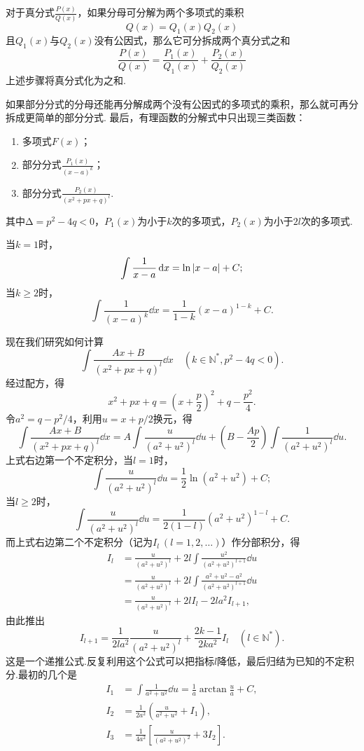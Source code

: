对于真分式\(\frac{P(x)}{Q(x)}\)，如果分母可分解为两个多项式的乘积\[
Q(x)=Q_1(x)Q_2(x)
\]且\(Q_1(x)\)与\(Q_2(x)\)没有公因式，那么它可分拆成两个真分式之和\[
\frac{P(x)}{Q(x)} = \frac{P_1(x)}{Q_1(x)} + \frac{P_2(x)}{Q_2(x)}
\]上述步骤将真分式化为之和.

如果部分分式的分母还能再分解成两个没有公因式的多项式的乘积，那么就可再分拆成更简单的部分分式.
最后，有理函数的分解式中只出现三类函数：
\begin{enumerate}
	\item 多项式\(F(x)\)；
	\item 部分分式\(\frac{P_1(x)}{(x-a)^k}\)；
	\item 部分分式\(\frac{P_2(x)}{(x^2+px+q)^l}\).
\end{enumerate}
其中\(\increment=p^2-4q<0\)，\(P_1(x)\)为小于\(k\)次的多项式，\(P_2(x)\)为小于\(2l\)次的多项式.

当\(k=1\)时，\[
\int \frac{1}{x-a} \dd{x} = \ln\abs{x-a} + C;
\]当\(k\geqslant2\)时，\[
\int \frac{1}{(x-a)^k} \dd{x} = \frac{1}{1-k} (x-a)^{1-k} + C.
\]

现在我们研究如何计算\[
\int \frac{Ax+B}{(x^2+px+q)^l} \dd{x}
\quad(k\in\mathbb{N}^*, p^2-4q<0).
\]经过配方，得\[
x^2+px+q = \left(x+\frac{p}{2}\right)^2 + q-\frac{p^2}{4}.
\]令\(a^2=q-p^2/4\)，利用\(u=x+p/2\)换元，得\[
\int \frac{Ax+B}{(x^2+px+q)^l} \dd{x}
= A \int \frac{u}{(a^2+u^2)^l} \dd{u}
+ \left(B - \frac{Ap}{2}\right) \int \frac{1}{(a^2+u^2)^l} \dd{u}.
\]上式右边第一个不定积分，当\(l=1\)时，\[
\int \frac{u}{(a^2+u^2)^l} \dd{u}
= \frac{1}{2} \ln(a^2+u^2) + C;
\]当\(l\geqslant2\)时，\[
\int \frac{u}{(a^2+u^2)^l} \dd{u}
= \frac{1}{2(1-l)} (a^2+u^2)^{1-l} + C.
\]而上式右边第二个不定积分（记为\(I_l\ (l=1,2,\dotsc)\)）作分部积分，得\begin{align*}
I_l &= \frac{u}{(a^2+u^2)^l} + 2l \int \frac{u^2}{(a^2+u^2)^{l+1}} \dd{u} \\
&= \frac{u}{(a^2+u^2)^l} + 2l \int \frac{a^2+u^2-a^2}{(a^2+u^2)^{l+1}} \dd{u} \\
&= \frac{u}{(a^2+u^2)^l} + 2l I_l - 2la^2 I_{l+1},
\end{align*}由此推出\[
I_{l+1} = \frac{1}{2la^2} \frac{u}{(a^2+u^2)^l} + \frac{2k-1}{2ka^2} I_l
\quad(l\in\mathbb{N}^*).
\]这是一个递推公式.反复利用这个公式可以把指标\(l\)降低，最后归结为已知的不定积分.最初的几个是\begin{align*}
I_1 &= \int \frac{1}{a^2+u^2} \dd{u} = \frac{1}{a} \arctan\frac{u}{a} + C, \\
I_2 &= \frac{1}{2a^2} \left( \frac{u}{a^2+u^2} + I_1 \right), \\
I_3 &= \frac{1}{4a^2} \left[ \frac{u}{(a^2+u^2)^2} + 3 I_2 \right].
\end{align*}

